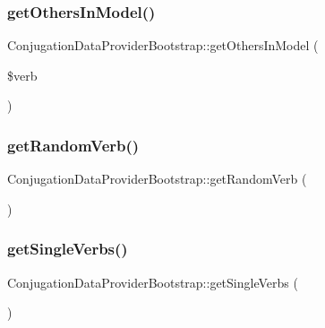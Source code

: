 \hypertarget{class_conjugation_data_provider_bootstrap_a26700071d61691ed0c751f061998cc81}{}\label{class_conjugation_data_provider_bootstrap_a26700071d61691ed0c751f061998cc81} 
\subsubsection{\texorpdfstring{get\+Others\+In\+Model()}{getOthersInModel()}}
{\footnotesize\ttfamily Conjugation\+Data\+Provider\+Bootstrap\+::get\+Others\+In\+Model (\begin{DoxyParamCaption}\item[{}]{\$verb }\end{DoxyParamCaption})}

\hypertarget{class_conjugation_data_provider_bootstrap_a3a63ae0c2e9cb52190dced76eeaf0c20}{}\label{class_conjugation_data_provider_bootstrap_a3a63ae0c2e9cb52190dced76eeaf0c20} 
\subsubsection{\texorpdfstring{get\+Random\+Verb()}{getRandomVerb()}}
{\footnotesize\ttfamily Conjugation\+Data\+Provider\+Bootstrap\+::get\+Random\+Verb (\begin{DoxyParamCaption}{ }\end{DoxyParamCaption})}

\hypertarget{class_conjugation_data_provider_bootstrap_a6ec1667942d4f6e08d5f5bf083388857}{}\label{class_conjugation_data_provider_bootstrap_a6ec1667942d4f6e08d5f5bf083388857} 
\subsubsection{\texorpdfstring{get\+Single\+Verbs()}{getSingleVerbs()}}
{\footnotesize\ttfamily Conjugation\+Data\+Provider\+Bootstrap\+::get\+Single\+Verbs (\begin{DoxyParamCaption}{ }\end{DoxyParamCaption})}

